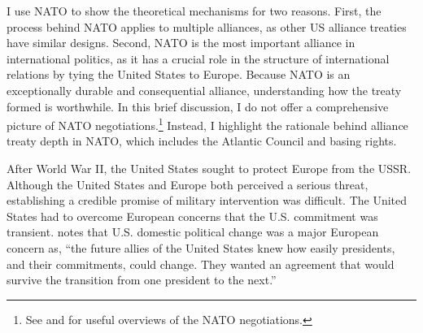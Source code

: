 \documentclass[12pt]{article}
\begin{document}
I use NATO to show the theoretical mechanisms for two reasons. 
First, the process behind NATO applies to multiple alliances, as other US alliance treaties have similar designs. 
Second, NATO is the most important alliance in international politics, as it has a crucial role in the structure of international relations by tying the United States to Europe. 
Because NATO is an exceptionally durable and consequential alliance, understanding how the treaty formed is worthwhile. 
In this brief discussion, I do not offer a comprehensive picture of NATO negotiations.\footnote{See \citet{Kaplan2007} and \citet{Poast2019a} for useful overviews of the NATO negotiations.} 
Instead, I highlight the rationale behind alliance treaty depth in NATO, which includes the Atlantic Council and basing rights. 


After World War II, the United States sought to protect Europe from the USSR. 
Although the United States and Europe both perceived a serious threat, establishing a credible promise of military intervention was difficult. 
The United States had to overcome European concerns that the U.S. commitment was transient.
\citet[pg. 14]{Sayle2019} notes that U.S. domestic political change was a major European concern as, ``the future allies of the United States knew how easily presidents, and their commitments, could change. They wanted an agreement that would survive the transition from one president to the next.'' 
\end{document}
